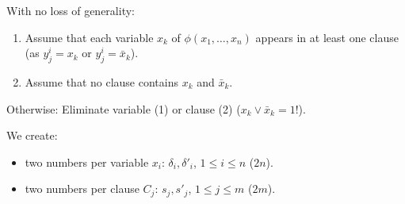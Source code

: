 With no loss of generality:
\begin{enumerate}
\item Assume that each variable $x_k$ of $\phi(x_1,\ldots,x_n)$ appears in at least one clause (as $y_j^i=x_k$ or $y_j^i=\bar x_k$).
\item Assume that no clause contains $x_k$ and $\bar x_k$.
\end{enumerate}
Otherwise: Eliminate variable (1) or clause (2) ($x_k\lor\bar x_k=1$!).

We create:
\begin{itemize}
\item two numbers per variable $x_i$: $\delta_i,\delta'_i$, $1\leq i\leq n$ ($2n$).
\item two numbers per clause $C_j$: $s_j,s'_j$, $1\leq j\leq m$ ($2m$).
\end{itemize}
